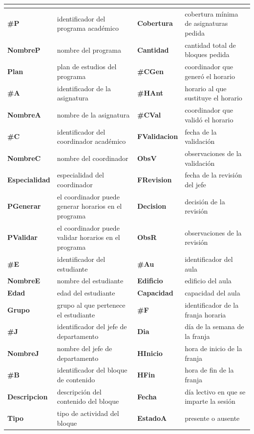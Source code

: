{\footnotesize\filas
\begin{xltabular}{\linewidth}{>{\bfseries}l L{1}>{\bfseries}l L{1}}
 &  &  &  \\
\endhead
\#P & identificador del programa académico & Cobertura & cobertura mínima de asignaturas pedida \\
NombreP & nombre del programa & Cantidad & cantidad total de bloques pedida \\
Plan & plan de estudios del programa & \#CGen & coordinador que generó el horario \\
\#A & identificador de la asignatura & \#HAnt & horario al que sustituye el horario \\
NombreA & nombre de la asignatura & \#CVal & coordinador que validó el horario \\
\#C & identificador del coordinador académico & FValidacion & fecha de la validación \\
NombreC & nombre del coordinador & ObsV & observaciones de la validación \\
Especialidad & especialidad del coordinador & FRevision & fecha de la revisión del jefe \\
PGenerar & el coordinador puede generar horarios en el programa & Decision & decisión de la revisión \\
PValidar & el coordinador puede validar horarios en el programa & ObsR & observaciones de la revisión \\
\#E & identificador del estudiante & \#Au & identificador del aula \\
NombreE & nombre del estudiante & Edificio & edificio del aula \\
Edad & edad del estudiante & Capacidad & capacidad del aula \\
Grupo & grupo al que pertenece el estudiante & \#F & identificador de la franja horaria \\
\#J & identificador del jefe de departamento & Dia & día de la semana de la franja \\
NombreJ & nombre del jefe de departamento & HInicio & hora de inicio de la franja \\
\#B & identificador del bloque de contenido & HFin & hora de fin de la franja \\
Descripcion & descripción del contenido del bloque & Fecha & día lectivo en que se imparte la sesión \\
Tipo & tipo de actividad del bloque & EstadoA & presente o ausente \\

\end{xltabular}}
